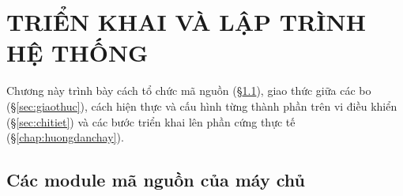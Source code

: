 \chapter{TRIỂN KHAI VÀ LẬP TRÌNH HỆ THỐNG}\label{chap:trienkhai}

Chương này trình bày cách tổ chức mã nguồn (\S\ref{sec:module}), giao thức giữa các bo
(\S\ref{sec:giaothuc}), cách hiện thực và cấu hình từng thành phần trên vi điều khiển
(\S\ref{sec:chitiet}) và các bước triển khai lên phần cứng thực tế (\S\ref{chap:huongdanchay}).

\section{Các module mã nguồn của máy chủ}\label{sec:module}
